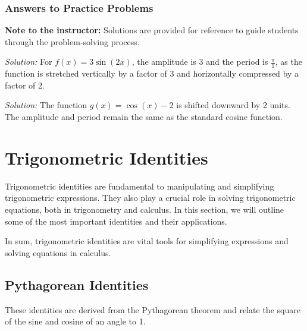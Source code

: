 \documentclass[a4paper,12pt]{book}
\newcounter{problem}
\newenvironment{solution}[1][]
{\par\noindent\textit{Solution:} \rmfamily}{\medskip}
\begin{document}
\subsubsection{Answers to Practice Problems}

\textbf{Note to the instructor:} Solutions are provided for reference to guide students through the problem-solving process.

\begin{solution}
For \( f(x) = 3\sin(2x) \), the amplitude is 3 and the period is \( \frac{\pi}{1} \), as the function is stretched vertically by a factor of 3 and horizontally compressed by a factor of 2.
\end{solution}

\begin{solution}
The function \( g(x) = \cos(x) - 2 \) is shifted downward by 2 units. The amplitude and period remain the same as the standard cosine function.
\end{solution}





\section{Trigonometric Identities}
\label{sec:trigonometric_identities}

Trigonometric identities are fundamental to manipulating and simplifying trigonometric expressions. They also play a crucial role in solving trigonometric equations, both in trigonometry and calculus. In this section, we will outline some of the most important identities and their applications.

In sum, trigonometric identities are vital tools for simplifying expressions and solving equations in calculus.

\subsection{Pythagorean Identities}
\label{subsec:pythagorean_identities}
These identities are derived from the Pythagorean theorem and relate the square of the sine and cosine of an angle to 1.
\end{document}
